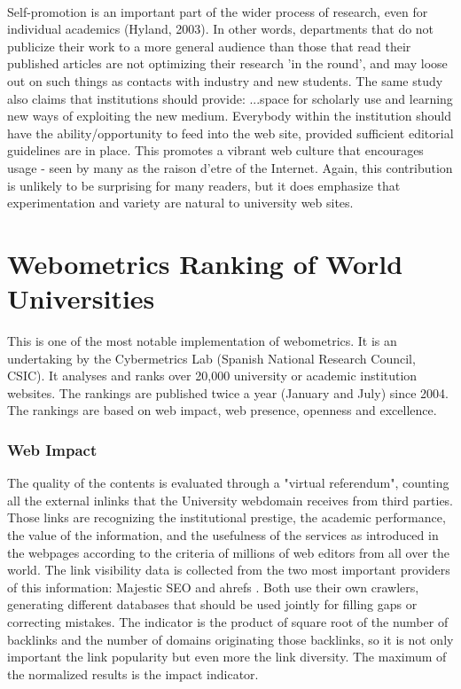 \paragraph{}
Self-promotion is an important part of the wider process of research, even for individual academics (Hyland, 2003). In other words, departments that do not publicize their work to a more general audience than those that read their published articles are not optimizing their research 'in the round', and may loose out on such things as contacts with industry and new students. The same study also claims that institutions should provide:
...space for scholarly use and learning new ways of exploiting the new medium. Everybody within the institution should have the ability/opportunity to feed into the web site, provided sufficient editorial guidelines are in place.
This promotes a vibrant web culture that encourages usage - seen by many as the raison d'etre of the Internet.
Again, this contribution is unlikely to be surprising for many readers, but it does emphasize that experimentation and variety are natural to university web sites.

\section{Webometrics Ranking of World Universities}
This is one of the most notable implementation of webometrics. It is an undertaking by the Cybermetrics Lab (Spanish National Research Council, CSIC). It analyses and ranks over 20,000 university or academic institution websites. The rankings are published twice a year (January and July) since 2004. The rankings are based on web impact, web presence, openness and excellence.

\subsubsection{Web Impact}
The quality of the contents is evaluated through a "virtual referendum", counting all the external inlinks that the University webdomain receives from third parties. Those links are recognizing the institutional prestige, the academic performance, the value of the information, and the usefulness of the services as introduced in the webpages according to the criteria of millions of web editors from all over the world. The link visibility data is collected from the two most important providers of this information: Majestic SEO and ahrefs . Both use their own crawlers, generating different databases that should be used jointly for filling gaps or correcting mistakes. The indicator is the product of square root of the number of backlinks and the number of domains originating those backlinks, so it is not only important the link popularity but even more the link diversity. The maximum of the normalized results is the impact indicator.

